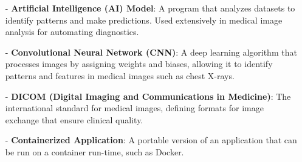 \documentclass[12pt]{article}
\begin{document}
\begin{itemize}
    
    
    \item[-] \textbf{Artificial Intelligence (AI) Model}: A program that analyzes datasets to identify patterns and make predictions. Used extensively in medical image analysis for automating diagnostics. 
    
    \item[-] \textbf{Convolutional Neural Network (CNN)}: A deep learning algorithm that processes images by assigning weights and biases, allowing it to identify patterns and features in medical images such as chest X-rays.
    
    \item[-] \textbf{DICOM (Digital Imaging and Communications in Medicine)}: The international standard for medical images, defining formats for image exchange that ensure clinical quality.
    
    \item[-] \textbf{Containerized Application}: A portable version of an application that can be run on a container run-time, such as Docker.
  

\end{itemize}
\end{document}

